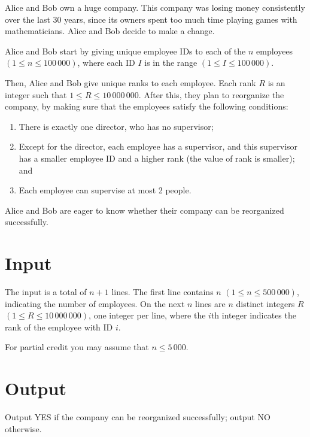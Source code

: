 Alice and Bob own a huge company. This company was losing money consistently over the last 30
years, since its owners spent too much time playing games with mathematicians. Alice and Bob
decide to make a change.

Alice and Bob start by giving unique employee IDs to each of the $n$ employees $(1 \le n \le 100\,000)$,
where each ID $I$ is in the range $(1 \le I \le 100\,000)$.

Then, Alice and Bob give unique ranks to each employee. Each rank $R$ is an integer such that
$1 \le R \le 10\,000\,000$. After this, they plan to reorganize the company, by making sure that the
employees satisfy the following conditions:
\begin{enumerate}
\item There is exactly one director, who has no supervisor;
\item Except for the director, each employee has a supervisor, and this supervisor has a smaller
employee ID and a higher rank (the value of rank is smaller); and
\item Each employee can supervise at most 2 people.
\end{enumerate}

Alice and Bob are eager to know whether their company can be reorganized successfully.

\section*{Input}
The input is a total of $n + 1$ lines. The first line contains $n$ $(1 \le n \le 500\,000)$,
indicating the number of employees. On the next $n$ lines are $n$ distinct integers $R$ $(1 \le R
\le 10\,000\,000)$, one integer per line, where the $i$th integer indicates the rank of the employee
with ID $i$.

For partial credit you may assume that $n\le 5\,000$.

\section*{Output}
Output YES if the company can be reorganized successfully; output NO otherwise.
